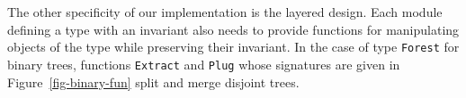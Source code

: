 \documentclass{llncs}
\begin{document}


The other specificity of our implementation is the layered design. Each module
defining a type with an invariant also needs to provide functions for
manipulating objects of the type while preserving their invariant. In the case
of type \texttt{Forest} for binary trees, functions \texttt{Extract} and
\texttt{Plug} whose signatures are given in Figure~\ref{fig-binary-fun} split
and merge disjoint trees.
\end{document}
